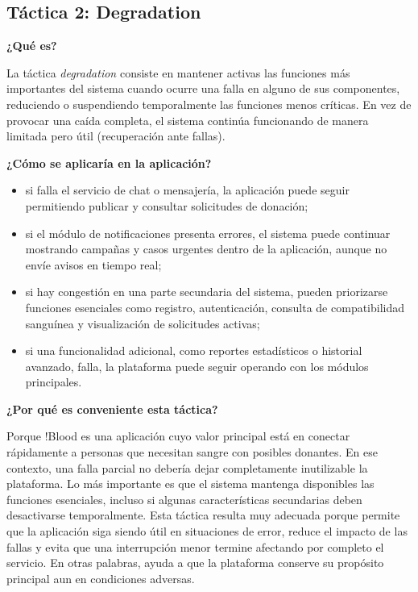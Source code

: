 \subsection{Táctica 2: Degradation}

\noindent\textbf{¿Qué es?}

La táctica \textit{degradation} consiste en mantener activas las funciones más importantes del sistema cuando ocurre una falla en alguno de sus componentes, reduciendo o suspendiendo temporalmente las funciones menos críticas. En vez de provocar una caída completa, el sistema continúa funcionando de manera limitada pero útil (recuperación ante fallas).

\medskip
\noindent\textbf{¿Cómo se aplicaría en la aplicación?}

\begin{itemize}
    \item si falla el servicio de chat o mensajería, la aplicación puede seguir permitiendo publicar y consultar solicitudes de donación;
    \item si el módulo de notificaciones presenta errores, el sistema puede continuar mostrando campañas y casos urgentes dentro de la aplicación, aunque no envíe avisos en tiempo real;
    \item si hay congestión en una parte secundaria del sistema, pueden priorizarse funciones esenciales como registro, autenticación, consulta de compatibilidad sanguínea y visualización de solicitudes activas;
    \item si una funcionalidad adicional, como reportes estadísticos o historial avanzado, falla, la plataforma puede seguir operando con los módulos principales.
\end{itemize}

\medskip
\noindent\textbf{¿Por qué es conveniente esta táctica?}

Porque !Blood es una aplicación cuyo valor principal está en conectar rápidamente a personas que necesitan sangre con posibles donantes. En ese contexto, una falla parcial no debería dejar completamente inutilizable la plataforma. Lo más importante es que el sistema mantenga disponibles las funciones esenciales, incluso si algunas características secundarias deben desactivarse temporalmente. Esta táctica resulta muy adecuada porque permite que la aplicación siga siendo útil en situaciones de error, reduce el impacto de las fallas y evita que una interrupción menor termine afectando por completo el servicio. En otras palabras, ayuda a que la plataforma conserve su propósito principal aun en condiciones adversas.
